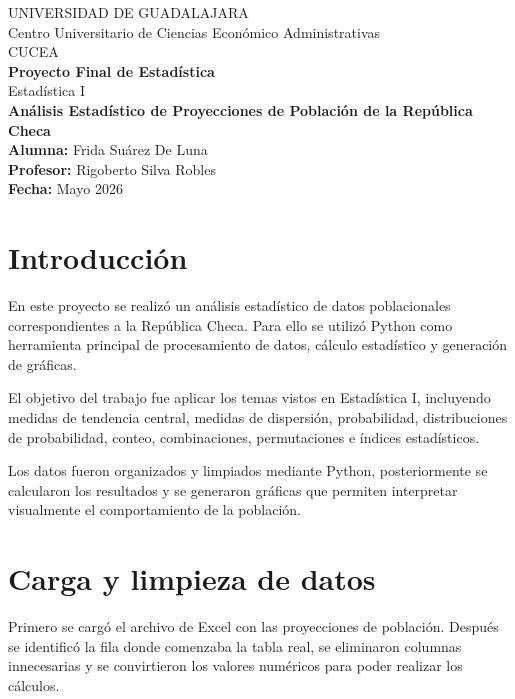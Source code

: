 \documentclass[12pt]{article}
\begin{document}
\begin{titlepage}
\centering
\vspace*{1.5cm}

{\Large UNIVERSIDAD DE GUADALAJARA}\\[0.3cm]
{\large Centro Universitario de Ciencias Económico Administrativas}\\[0.3cm]
{\large CUCEA}\\[1.5cm]

{\Huge \textbf{Proyecto Final de Estadística}}\\[0.7cm]
{\LARGE Estadística I}\\[1cm]

{\Large \textbf{Análisis Estadístico de Proyecciones de Población de la República Checa}}\\[2cm]

\textbf{Alumna:} Frida Suárez De Luna\\[0.4cm]
\textbf{Profesor:} Rigoberto Silva Robles\\[0.4cm]
\textbf{Fecha:} Mayo 2026

\vfill
\end{titlepage}

\tableofcontents
\newpage

\section{Introducción}

En este proyecto se realizó un análisis estadístico de datos poblacionales correspondientes a la República Checa. Para ello se utilizó Python como herramienta principal de procesamiento de datos, cálculo estadístico y generación de gráficas.

El objetivo del trabajo fue aplicar los temas vistos en Estadística I, incluyendo medidas de tendencia central, medidas de dispersión, probabilidad, distribuciones de probabilidad, conteo, combinaciones, permutaciones e índices estadísticos.

Los datos fueron organizados y limpiados mediante Python, posteriormente se calcularon los resultados y se generaron gráficas que permiten interpretar visualmente el comportamiento de la población.

\section{Carga y limpieza de datos}

Primero se cargó el archivo de Excel con las proyecciones de población. Después se identificó la fila donde comenzaba la tabla real, se eliminaron columnas innecesarias y se convirtieron los valores numéricos para poder realizar los cálculos.
\end{document}

